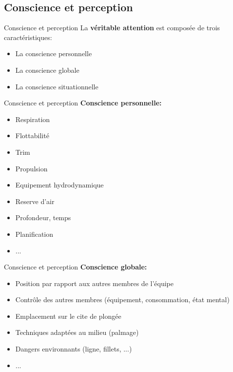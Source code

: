 \subsection{Conscience et perception}

\begin{frame}{Conscience et perception}  
	La \textbf{véritable attention} est composée de trois caractéristiques:
	\begin{itemize}
		\item La conscience personnelle
		\item La conscience globale
		\item La conscience situationnelle
	\end{itemize}
\end{frame}

\begin{frame}{Conscience et perception} 
	\textbf{Conscience personnelle:}\\
	\begin{itemize}
		\item Respiration
		\item Flottabilité
		\item Trim
		\item Propulsion
		\item Equipement hydrodynamique
		\item Reserve d'air
		\item Profondeur, temps
		\item Planification
		\item ...
	\end{itemize}
\end{frame}

\begin{frame}{Conscience et perception}  
	\textbf{Conscience globale:}
	\begin{itemize}
		\item Position par rapport aux autres membres de l'équipe
		\item Contrôle des autres membres (équipement, consommation, état mental)
		\item Emplacement sur le cite de plongée
		\item Techniques adaptées au milieu (palmage)
		\item Dangers environnants (ligne, fillets, ...)
		\item ...
	\end{itemize}
\end{frame}

